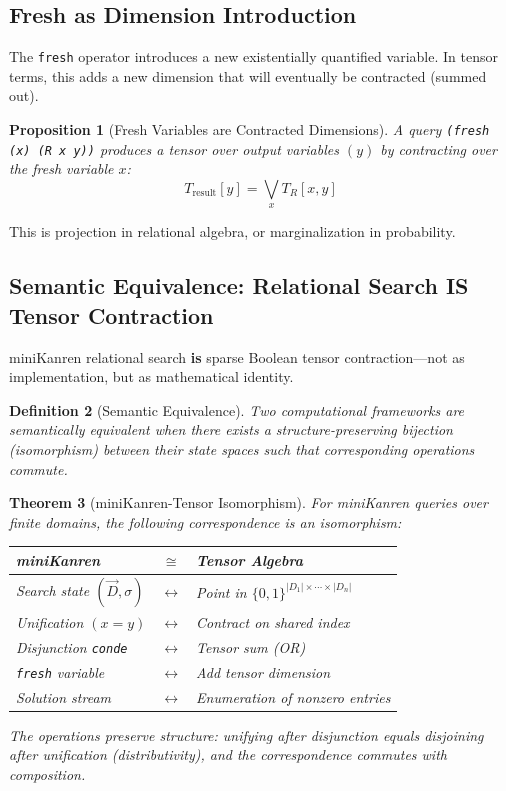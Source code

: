 \documentclass[11pt,a4paper]{article}
\newtheorem{theorem}{Theorem}
\newtheorem{definition}[theorem]{Definition}
\newtheorem{proposition}[theorem]{Proposition}
\begin{document}
\subsection{Fresh as Dimension Introduction}

The \texttt{fresh} operator introduces a new existentially quantified variable.
In tensor terms, this adds a new dimension that will eventually be contracted (summed out).

\begin{proposition}[Fresh Variables are Contracted Dimensions]
A query \texttt{(fresh (x) (R x y))} produces a tensor over output variables $(y)$
by contracting over the fresh variable $x$:
\[
T_{\text{result}}[y] = \bigvee_x T_R[x, y]
\]
\end{proposition}

This is projection in relational algebra, or marginalization in probability.

\subsection{Semantic Equivalence: Relational Search IS Tensor Contraction}

miniKanren relational search \textbf{is} sparse Boolean tensor contraction---not
as implementation, but as mathematical identity.

\begin{definition}[Semantic Equivalence]
Two computational frameworks are \emph{semantically equivalent} when there exists
a structure-preserving bijection (isomorphism) between their state spaces such that
corresponding operations commute.
\end{definition}

\begin{theorem}[miniKanren-Tensor Isomorphism]
\label{thm:isomorphism_chirho}
For miniKanren queries over finite domains, the following correspondence is an isomorphism:
\begin{center}
\begin{tabular}{lcl}
\textbf{miniKanren} & $\cong$ & \textbf{Tensor Algebra} \\
\hline
Search state $(\vec{D}, \sigma)$ & $\leftrightarrow$ & Point in $\{0,1\}^{|D_1| \times \cdots \times |D_n|}$ \\
Unification $(x = y)$ & $\leftrightarrow$ & Contract on shared index \\
Disjunction \texttt{conde} & $\leftrightarrow$ & Tensor sum (OR) \\
\texttt{fresh} variable & $\leftrightarrow$ & Add tensor dimension \\
Solution stream & $\leftrightarrow$ & Enumeration of nonzero entries \\
\end{tabular}
\end{center}
The operations preserve structure: unifying after disjunction equals disjoining after unification
(distributivity), and the correspondence commutes with composition.
\end{theorem}
\end{document}

